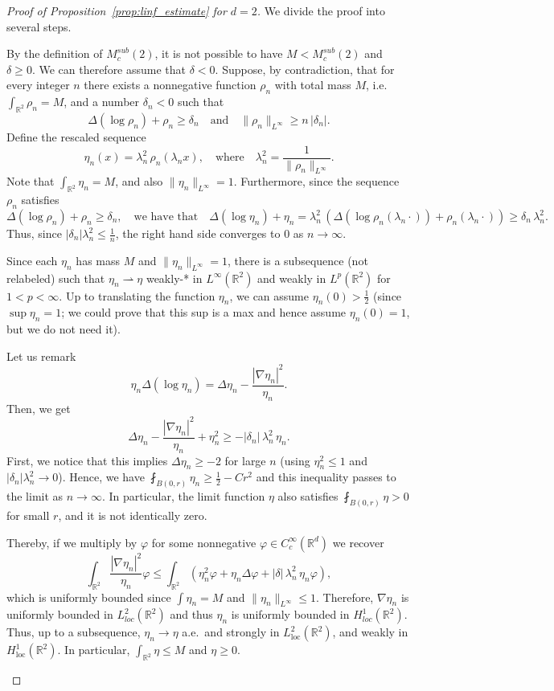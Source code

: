 \documentclass[11pt,a4paper]{article}
\numberwithin{equation}{section}
\newcommand{\R}{{\mathbb{R}}}
\theoremstyle{plain}
\theoremstyle{remark}
\newcommand {\f}{\frac}
\newcommand{\step}[1][]{%
  \if\relax\detokenize{#1}\relax
    \def\thisstep{.}%
  \else
    \def\thisstep{: \protect #1.}%
  \fi
  \item}
\begin{document}
\begin{proof}[Proof of Proposition~\ref{prop:linf_estimate} for $d=2$] 
We divide the proof into several steps.

\begin{enumeratesteps}
\step[Setting the contradiction]
By the definition of $M^{sub}_c(2)$, it is not possible to have $M<M^{sub}_c(2)$ and $\delta \geq 0$. We can therefore assume that $\delta <  0$. Suppose, by contradiction, that for every integer $n$ there exists a nonnegative function $\rho_n$ with total mass $M$, i.e. $\int_{\mathbb{R}^2}\rho_n = M$, and a number $\delta_n<0$ such that 
\[
    \Delta(\log\rho_n) + \rho_n  \ge  \delta_n
    \quad\text{and}\quad
    \|\rho_n\|_{L^\infty}  \ge  n\,|\delta_n|.
\]
Define the rescaled sequence
\[
    \eta_n(x) = \lambda_n^2\,\rho_n\left(\lambda_n x\right),
    \quad
    \text{where}
    \quad
    \lambda_n^2 
    = 
    \f{1}{\|\rho_n\|_{L^\infty}}.
\]
Note that $\int_{\mathbb{R}^2}\eta_n = M$, and also $\|\eta_n\|_{L^\infty} =1$. Furthermore, since the sequence $\rho_n$ satisfies
\[
\Delta(\log\rho_n) + \rho_n  \ge  \delta_n,
\quad\text{we have that}\quad
\Delta(\log \eta_n) + \eta_n 
 = 
\lambda_n^2\,(\Delta\left(\log \rho_n(\lambda_n\cdot)\right) + \rho_n(\lambda_n\cdot) )
 \ge 
\delta_n\,\lambda_n^2.
\]
Thus, since $|\delta_n|\lambda_n^2 \leq \frac1n$, the right hand side converges to $0$ as $n \rightarrow \infty$.

\step[Compactness]
Since each $\eta_n$ has mass $M$ and $\|\eta_n\|_{L^\infty}= 1$, there is a subsequence (not relabeled) such that $\eta_n\rightharpoonup \eta$ weakly-* in $L^\infty(\mathbb{R}^2)$ and weakly in $L^p(\mathbb{R}^2)$ for $1<p<\infty$. Up to translating the function $\eta_n$, we can assume $\eta_n(0)>\frac12$ (since $\sup\eta_n=1$; we could prove that this sup is a max and hence assume $\eta_n(0)=1$, but we do not need it).

Let us remark 
\[
\eta_n\Delta(\log \eta_n)  =  \Delta \eta_n  - \f{|\nabla \eta_n|^2}{\,\eta_n\,}.
\]
Then, we get 
\[
\Delta \eta_n - \f{|\nabla \eta_n|^2}{\,\eta_n\,} + \eta_n^2  \ge  -|\delta_n|\,\lambda_n^2\,\eta_n.
\]
First, we notice that this implies $\Delta \eta_n\geq -2$ for large $n$ (using $\eta_n^2\leq 1$ and $|\delta_n|\lambda_n^2\to 0$). Hence, we have $\fint_{B(0,r)} \eta_n\geq\frac12-Cr^2$ and this inequality passes to the limit as $n\to\infty$. In particular, the limit function $\eta$ also satisfies $\fint_{B(0,r)}\eta>0 $ for small $r$, and it is not identically zero.

Thereby, if we multiply by $\varphi$ for some nonnegative $\varphi\in C_{c}^{\infty}(\R^d)$ we recover 
\[
\int_{\mathbb{R}^2}\f{|\nabla \eta_n|^2}{\,\eta_n\,}\varphi
 \le 
\int_{\mathbb{R}^2}\left(\eta_n^2\varphi + \eta_n\Delta\varphi + |\delta|\,\lambda_n^2\,\eta_n\varphi\right),
\]
which is uniformly bounded since $\int \eta_n=M$ and $\|\eta_n\|_{L^\infty}\le1$. Therefore, $\nabla \eta_n$ is uniformly bounded in $L^2_{loc}(\mathbb{R}^2)$ and thus $\eta_n$ is uniformly bounded in $H^{1}_{loc}(\mathbb{R}^2)$. Thus, up to a subsequence, $\eta_n\to \eta$ a.e.\ and strongly in $L^2_{\mathrm{loc}}(\mathbb{R}^2)$, and weakly in $H^1_{\mathrm{loc}}(\mathbb{R}^2)$. In particular, $\int_{\mathbb{R}^2}\eta\le M$ and $\eta\ge0$.


\end{enumeratesteps}
\end{proof}
\end{document}
